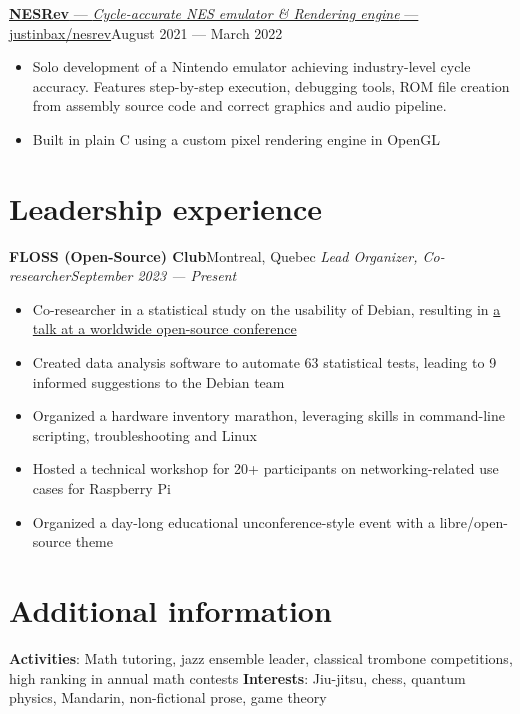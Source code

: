 \documentclass{article}
\newcommand{\newrole}[4]{
    {\normalfont\textbf{#1}\hfill#3}
    \newline
    \textit{#2}\hfill\textit{#4}
}
\newcommand{\shortlinkrole}[5]{
    {\href{#3}{\normalfont\textbf{#1} --- \textit{#2} --- #4\:\faExternalLink}\hfill#5\vspace*{-4pt}}
}
\newenvironment{bulletpoints}{\begin{itemize}\setlength\itemsep{-0.2em}}{\end{itemize}}
\begin{document}
\shortlinkrole{NESRev}{Cycle-accurate NES emulator \& Rendering engine}{https://github.com/justinbax/nesrev}{justinbax/nesrev}{August 2021 --- March 2022}
\begin{bulletpoints}
    \item Solo development of a Nintendo emulator achieving industry-level cycle accuracy. Features step-by-step execution, debugging tools, ROM file creation from assembly source code and correct graphics and audio pipeline.
    \item Built in plain C using a custom pixel rendering engine in OpenGL
\end{bulletpoints}


\section*{Leadership experience}
\newrole{FLOSS (Open-Source) Club}{Lead Organizer, Co-researcher}{Montreal, Quebec}{September 2023 --- Present}
\begin{bulletpoints}
    \item Co-researcher in a statistical study on the usability of Debian, resulting in \href{https://debconf24.debconf.org/talks/49-debian-installer-usability-tests-take-2/}{a talk at a worldwide open-source conference}
    \item Created data analysis software to automate 63 statistical tests, leading to 9 informed suggestions to the Debian team
    \item Organized a hardware inventory marathon, leveraging skills in command-line scripting, troubleshooting and Linux
    \item Hosted a technical workshop for 20+ participants on networking-related use cases for Raspberry Pi
    \item Organized a day-long educational unconference-style event with a libre/open-source theme
\end{bulletpoints}


\section*{Additional information}
{\bfseries Activities}: Math tutoring, jazz ensemble leader, classical trombone competitions, high ranking in annual math contests
\newline
{\bfseries Interests}: Jiu-jitsu, chess, quantum physics, Mandarin, non-fictional prose, game theory
\end{document}

